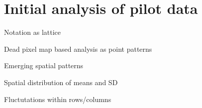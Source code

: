 \documentclass[../IO-Pixels.tex]{subfiles}
\begin{document}
\section{Initial analysis of pilot data}
\begin{outline}
Notation as lattice

Dead pixel map based analysis as point patterns

Emerging spatial patterns

Spatial distribution of means and SD

Fluctutations within rows/columns
\end{outline}
\end{document}
